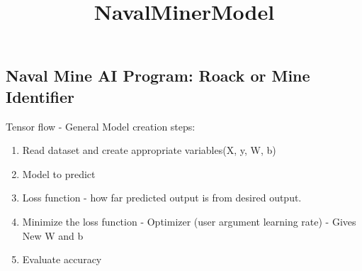 \documentclass[11pt]{article}
\title{NavalMinerModel}
\providecommand{\tightlist}{%
      \setlength{\itemsep}{0pt}\setlength{\parskip}{0pt}}
\begin{document}
    
    
    \maketitle
    
    

    
    \subsection{Naval Mine AI Program: Roack or Mine
Identifier}\label{naval-mine-ai-program-roack-or-mine-identifier}

Tensor flow - General Model creation steps:

\begin{enumerate}
\def\labelenumi{\arabic{enumi}.}
\tightlist
\item
  Read dataset and create appropriate variables(X, y, W, b)
\item
  Model to predict
\item
  Loss function - how far predicted output is from desired output.
\item
  Minimize the loss function - Optimizer (user argument learning rate) -
  Gives New W and b
\item
  Evaluate accuracy
\end{enumerate}
\end{document}
